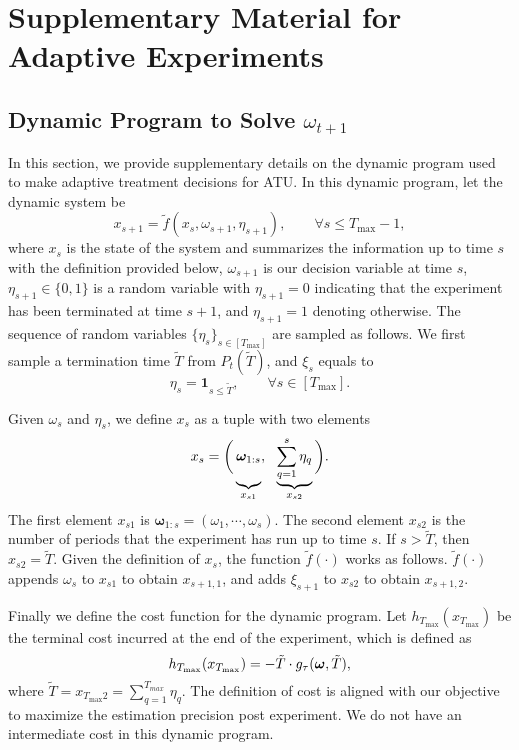 \section{Supplementary Material for Adaptive Experiments}\label{sec:more-detail-sequential}

{\blue 
\subsection{Dynamic Program to Solve $\omega_{t+1}$}\label{subsec:dp-omega}
In this section, we provide supplementary details on the dynamic program used to make adaptive treatment decisions for ATU.
%
In this dynamic program, let the dynamic system be
\[x_{s+1} = \tilde{f}(x_s, \omega_{s+1}, \eta_{s+1}), \qquad \forall  s \leq T_{\max}-1, \]
where $x_s$ is the state of the system and summarizes the information up to time $s$ with the definition provided below, $\omega_{s+1}$ is our decision variable at time $s$, $\eta_{s+1} \in \{0,1\}$ is a random variable with $\eta_{s+1} = 0$ indicating that the experiment has been terminated at time $s+1$, and $\eta_{s+1} = 1$ denoting otherwise. The sequence of random variables $\{\eta_s\}_{s \in [T_{\max}]}$ are sampled as follows. We first sample a termination time $\tilde T$ from $P_t(\tilde T)$, and $\xi_s$ equals to
\[\eta_s = \bm{1}_{s \leq \tilde T}, \qquad \forall  s \in [T_{\max}]. \]

Given $\omega_{s}$ and $\eta_{s}$, we define $x_s$ as a tuple with two elements
\[x_s = \bigg( \underbrace{\vphantom{\sum_{q = 1}^s \xi_q}\bm{\omega}_{1:s}}_{x_{s1}},\,\,\,\, \underbrace{\sum_{q = 1}^s \eta_q}_{x_{s2}} \bigg). \]
The first element $x_{s1}$ is $\bm{\omega}_{1:s} = (\omega_1, \cdots, \omega_s)$. The second element $x_{s2}$ is the number of periods that the experiment has run up to time $s$. If $s > \tilde T$, then  $x_{s2} = \tilde T$. Given the definition of $x_s$, the function $\tilde{f}(\cdot)$ works as follows.  $\tilde{f}(\cdot)$ appends $\omega_s$ to $x_{s1}$ to obtain $x_{s+1,1}$, and adds $\xi_{s+1}$ to $x_{s2}$ to obtain $x_{s+1,2}$. 

Finally we define the cost function for the dynamic program. Let $h_{T_{\max}}(x_{T_{\max}})$ be the terminal cost incurred at the end of the experiment, which is defined as
\[h_{T_{\max}}(x_{T_{\max}})= - \tilde T\cdot g_\tau(\bm{\omega}, \tilde T), \]
where $\tilde T = x_{T_{\max}2} = \sum_{q=1}^{T_{max}} \eta_q$. The definition of cost is aligned with our objective to maximize the estimation precision post experiment. We do not have an intermediate cost in this dynamic program.

}
